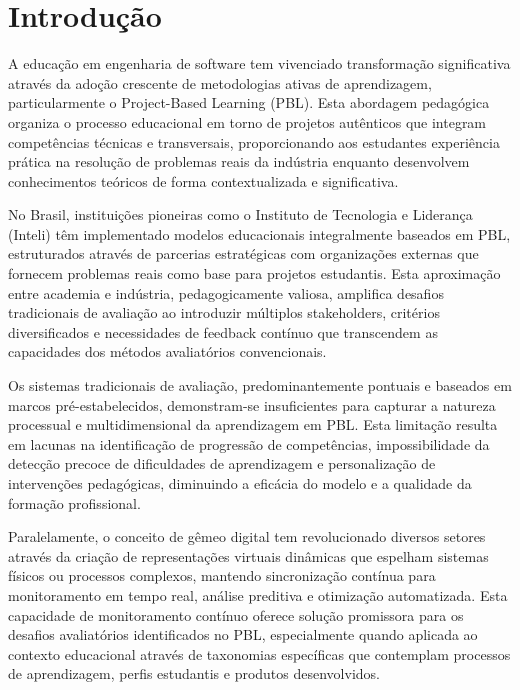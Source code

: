 \documentclass[english, spanish, brazilian]{RBIEarticle} %
\begin{document}
\pagebreak


\section{Introdução}

\indent

A educação em engenharia de software tem vivenciado transformação significativa
através da adoção crescente de metodologias ativas de aprendizagem,
particularmente o Project-Based Learning (PBL). Esta abordagem pedagógica
organiza o processo educacional em torno de projetos autênticos que integram
competências técnicas e transversais, proporcionando aos estudantes experiência
prática na resolução de problemas reais da indústria enquanto desenvolvem
conhecimentos teóricos de forma contextualizada e significativa.

No Brasil, instituições pioneiras como o Instituto de Tecnologia e Liderança
(Inteli) têm implementado modelos educacionais integralmente baseados em PBL,
estruturados através de parcerias estratégicas com organizações externas que
fornecem problemas reais como base para projetos estudantis. Esta aproximação
entre academia e indústria, pedagogicamente valiosa, amplifica desafios
tradicionais de avaliação ao introduzir múltiplos stakeholders, critérios
diversificados e necessidades de feedback contínuo que transcendem as
capacidades dos métodos avaliatórios convencionais.

Os sistemas tradicionais de avaliação, predominantemente pontuais e baseados em
marcos pré-estabelecidos, demonstram-se insuficientes para capturar a natureza
processual e multidimensional da aprendizagem em PBL. Esta limitação resulta em
lacunas na identificação de progressão de competências, impossibilidade da
detecção precoce de dificuldades de aprendizagem e personalização de
intervenções pedagógicas, diminuindo a eficácia do modelo e a qualidade da
formação profissional.

Paralelamente, o conceito de gêmeo digital tem revolucionado diversos setores
através da criação de representações virtuais dinâmicas que espelham sistemas
físicos ou processos complexos, mantendo sincronização contínua para
monitoramento em tempo real, análise preditiva e otimização automatizada. Esta
capacidade de monitoramento contínuo oferece solução promissora para os
desafios avaliatórios identificados no PBL, especialmente quando aplicada ao
contexto educacional através de taxonomias específicas que contemplam processos
de aprendizagem, perfis estudantis e produtos desenvolvidos.
\end{document}
